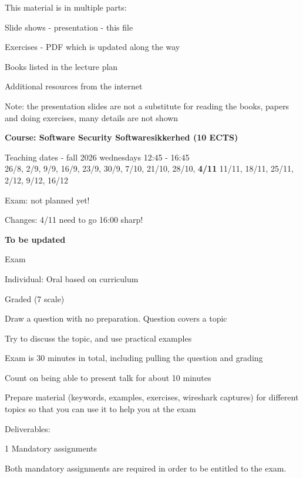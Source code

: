 \documentclass[Screen16to9,17pt]{foils}
\begin{document}
\begin{list1}
\item This material is in multiple parts:
\begin{list2}
\item Slide shows - presentation - this file
\item Exercises - PDF which is updated along the way
\end{list2}
\item Books listed in the lecture plan
\item Additional resources from the internet
\item Note: the presentation slides are not a substitute for reading the books, papers and doing exercises, many details are not shown
\end{list1}



{\bf Course: Software Security
Softwaresikkerhed (10 ECTS)}

Teaching dates - fall 2026 wednesdays 12:45 - 16:45\\
26/8, 2/9, 9/9, 16/9, 23/9, 30/9, 7/10, 21/10, 28/10, {\bf 4/11} 11/11, 18/11, 25/11, 2/12, 9/12, 16/12

Exam: not planned yet!

Changes: 4/11 need to go 16:00 sharp!


{\bf To be updated}
\begin{list2}
\item Exam
\item Individual: Oral based on curriculum
\item Graded (7 scale)
\item Draw a question with no preparation. Question covers a topic
\item Try to discuss the topic, and use practical examples
\item Exam is 30 minutes in total, including pulling the question and grading
\item Count on being able to present talk for about 10 minutes
\item Prepare material (keywords, examples, exercises, wireshark captures) for different topics so that you can use it to help you at the exam
\item Deliverables:
\item 1 Mandatory assignments
\item Both mandatory assignments are required in order to be entitled to the exam.
\end{list2}
\end{document}
